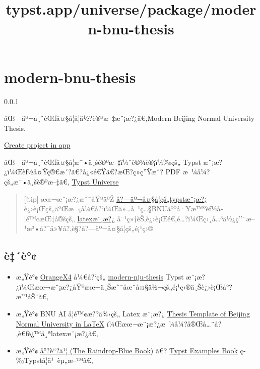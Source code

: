 \title{typst.app/universe/package/modern-bnu-thesis}

\label{banner}
\label{template-thumbnail}

\section{modern-bnu-thesis}\label{modern-bnu-thesis}

{ 0.0.1 }

åŒ---äº¬å¸ˆèŒƒå¤§å­¦å­¦ä½?è®ºæ--‡æ¨¡æ?¿ã€‚Modern Beijing Normal University
Thesis.

\href{/app?template=modern-bnu-thesis&version=0.0.1}{Create project in
app}

\label{readme}
åŒ---äº¬å¸ˆèŒƒå¤§å­¦æ¯•ä¸šè®ºæ--‡ï¼ˆè®¾è®¡ï¼‰çš„ Typst
æ¨¡æ?¿ï¼Œèƒ½å¤Ÿç®€æ´?ã€?å¿«é€Ÿã€?æŒ?ç»­ç''Ÿæˆ? PDF
æ~¼å¼?çš„æ¯•ä¸šè®ºæ--‡ã€‚
\href{https://typst.app/universe/package/modern-bnu-thesis}{Typst
Universe}

\begin{quote}
{[}!tip{]} æœ¬æ¨¡æ?¿æ˜¯åŸºäºŽ
\href{https://github.com/nju-lug/modern-nju-thesis/tree/main}{å?---äº¬å¤§å­¦çš„typstæ¨¡æ?¿}
è¿›è¡Œçš„äºŒæ¬¡å¼€å?{}`ï¼Œä»\ldots å¯¹ç\ldots§BNUäººå·¥æ™ºèƒ½å­¦é™¢æŒ‡å®šçš„
\href{https://www.overleaf.com/latex/templates/thesis-template-of-beijing-normal-university-in-latex/nrjdjsvfxhms}{latexæ¨¡æ?¿}
å¯¹ç»†èŠ‚è¿›è¡Œé€‚é\ldots?ï¼Œç›¸å\ldots³ä½¿ç''¨æ--¹æ³•å?¯ä»¥å?‚è§?å?---äº¬å¤§å­¦çš„é¡¹ç›®
\end{quote}

\subsection{è‡´è°¢}\label{uxe8uxe8}

\begin{itemize}
\tightlist
\item
  æ„Ÿè°¢ \href{https://github.com/OrangeX4}{OrangeX4} å¼€å?{}`çš„
  \href{https://github.com/nju-lug/modern-nju-thesis}{modern-nju-thesis}
  Typst
  æ¨¡æ?¿ï¼Œæœ¬æ¨¡æ?¿åŸºæœ¬ä¸Šæ˜¯åœ¨å¤§ä½¬çš„é¡¹ç›®ä¸Šè¿›è¡Œå°?æ''¹åŠ¨ã€‚
\item
  æ„Ÿè°¢ BNU AI å­¦é™¢æ??ä¾›çš„ Latex æ¨¡æ?¿
  \href{https://www.overleaf.com/latex/templates/thesis-template-of-beijing-normal-university-in-latex/nrjdjsvfxhms}{Thesis
  Template of Beijing Normal University in LaTeX}
  ï¼Œæœ¬æ¨¡æ?¿æ~¼å¼?å®Œå\ldots¨å?‚è€ƒè¿™ä¸ªlatexæ¨¡æ?¿ã€‚
\item
  æ„Ÿè°¢ \href{https://typst-doc-cn.github.io/tutorial/}{å°?è``?ä¹¦ (The
  Raindrop-Blue Book)} ã€?
  \href{https://sitandr.github.io/typst-examples-book/book/}{Typst
  Examples Book} ç­‰Typstå­¦ä¹~èµ„æ--™ã€‚
\end{itemize}

